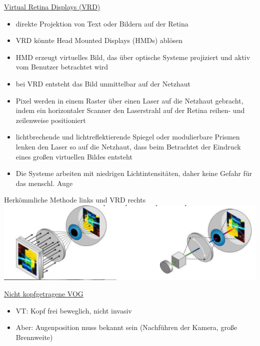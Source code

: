 \documentclass[a4paper,10pt,oneside]{article}
\begin{document}
\underline{Virtual Retina Displays (VRD)} \\
	\begin{itemize}
		\item direkte Projektion von Text oder Bildern auf der Retina
		\item VRD könnte Head Mounted Displays (HMDs) ablösen
		\item HMD erzeugt virtuelles Bild, das über optische Systeme projiziert und aktiv vom Benutzer betrachtet wird
		\item bei VRD entsteht das Bild unmittelbar auf der Netzhaut
		\item Pixel werden in einem Raster über einen Laser auf die Netzhaut gebracht, indem ein horizontaler Scanner den Laserstrahl auf der Retina reihen- und zeilenweise positioniert
		\item lichtbrechende und lichtreflektierende Spiegel oder modulierbare Prismen lenken den Laser so auf die Netzhaut, dass beim Betrachtet der Eindruck eines großen virtuellen Bildes entsteht
		\item Die Systeme arbeiten mit niedrigen Lichtintensitäten, daher keine Gefahr für das menschl. Auge
	\end{itemize}

Herkömmliche Methode links und VRD rechts
\includegraphics[scale=0.2]{Grafiken/2055.png}

\underline{Nicht kopfgetragene VOG} \\
	\begin{itemize}
		\item VT: Kopf frei beweglich, nicht invasiv
		\item Aber: Augenposition muss bekannt sein (Nachführen der Kamera, große Brennweite)
	\end{itemize}	 
	
\end{document}
